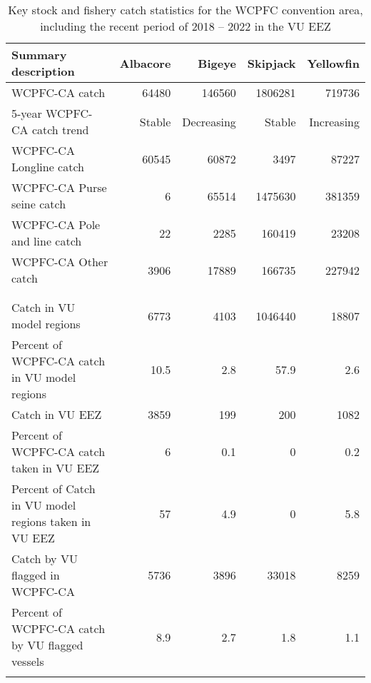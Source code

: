 \begin{longtable}{lrrrr}
\caption{Key stock and fishery catch statistics for the WCPFC convention area, including the recent period of 2018 -- 2022 in the VU EEZ} \\ 
  \hline
Summary description & Albacore & Bigeye & Skipjack & Yellowfin \\ 
  \hline
WCPFC-CA catch & 64480 & 146560 & 1806281 & 719736 \\ 
  5-year WCPFC-CA catch trend & Stable & Decreasing & Stable & Increasing \\ 
  WCPFC-CA Longline catch & 60545 & 60872 & 3497 & 87227 \\ 
  WCPFC-CA Purse seine catch & 6 & 65514 & 1475630 & 381359 \\ 
  WCPFC-CA Pole and line catch & 22 & 2285 & 160419 & 23208 \\ 
  WCPFC-CA Other catch & 3906 & 17889 & 166735 & 227942 \\ 
   &  &  &  &  \\ 
   &  &  &  &  \\ 
   \hline
Catch in VU model regions & 6773 & 4103 & 1046440 & 18807 \\ 
  Percent of WCPFC-CA catch in VU model regions & 10.5 & 2.8 & 57.9 & 2.6 \\ 
  Catch in VU EEZ & 3859 & 199 & 200 & 1082 \\ 
  Percent of WCPFC-CA catch taken in VU EEZ & 6 & 0.1 & 0 & 0.2 \\ 
  Percent of Catch in VU model regions taken in VU EEZ & 57 & 4.9 & 0 & 5.8 \\ 
  Catch by VU flagged in WCPFC-CA & 5736 & 3896 & 33018 & 8259 \\ 
  Percent of WCPFC-CA catch by VU flagged vessels & 8.9 & 2.7 & 1.8 & 1.1 \\ 
  \hline
\label{cat_sum_tab}
\end{longtable}
